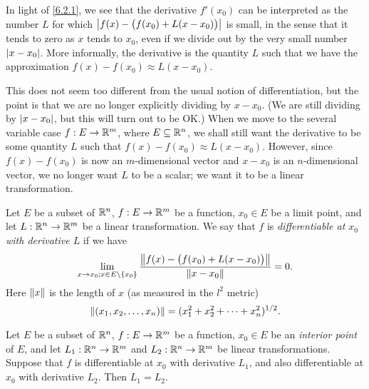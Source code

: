\begin{note}
  In light of \cref{6.2.1}, we see that the derivative \(f'(x_0)\) can be interpreted as the number \(L\) for which \(\abs{f(x) - \big(f(x_0) + L(x - x_0)\big)}\) is small, in the sense that it tends to zero as \(x\) tends to \(x_0\), even if we divide out by the very small number \(\abs{x - x_0}\).
  More informally, the derivative is the quantity \(L\) such that we have the approximation \(f(x) - f(x_0) \approx L(x - x_0)\).

  This does not seem too different from the usual notion of differentiation, but the point is that we are no longer explicitly dividing by \(x - x_0\).
  (We are still dividing by \(\abs{x - x_0}\), but this will turn out to be OK.)
  When we move to the several variable case \(f : E \to \R^m\), where \(E \subseteq \R^n\), we shall still want the derivative to be some quantity \(L\) such that \(f(x) - f(x_0) \approx L(x - x_0)\).
  However, since \(f(x) - f(x_0)\) is now an \(m\)-dimensional vector and \(x - x_0\) is an \(n\)-dimensional vector, we no longer want \(L\) to be a scalar;
  we want it to be a linear transformation.
\end{note}

\begin{defn}[Differentiability]\label{6.2.2}
  Let \(E\) be a subset of \(\R^n\), \(f : E \to \R^m\) be a function, \(x_0 \in E\) be a limit point, and let \(L : \R^n \to \R^m\) be a linear transformation.
  We say that \(f\) is \emph{differentiable at \(x_0\) with derivative \(L\)} if we have
  \[
    \lim_{x \to x_0 ; x \in E \setminus \set{x_0}} \dfrac{\norm*{f(x) - \big(f(x_0) + L(x - x_0)\big)}}{\norm*{x - x_0}} = 0.
  \]
  Here \(\norm*{x}\) is the length of \(x\) (as measured in the \(l^2\) metric)
  \[
    \norm*{(x_1, x_2, \dots, x_n)} = (x_1^2 + x_2^2 + \dots + x_n^2)^{1 / 2}.
  \]
\end{defn}

\setcounter{thm}{3}
\begin{lem}\label{6.2.4}
  Let \(E\) be a subset of \(\R^n\), \(f : E \to \R^m\) be a function, \(x_0 \in E\) be an \emph{interior point} of \(E\), and let \(L_1 : \R^n \to \R^m\) and \(L_2 : \R^n \to \R^m\) be linear transformations.
  Suppose that \(f\) is differentiable at \(x_0\) with derivative \(L_1\), and also differentiable at \(x_0\) with derivative \(L_2\).
  Then \(L_1 = L_2\).
\end{lem}

